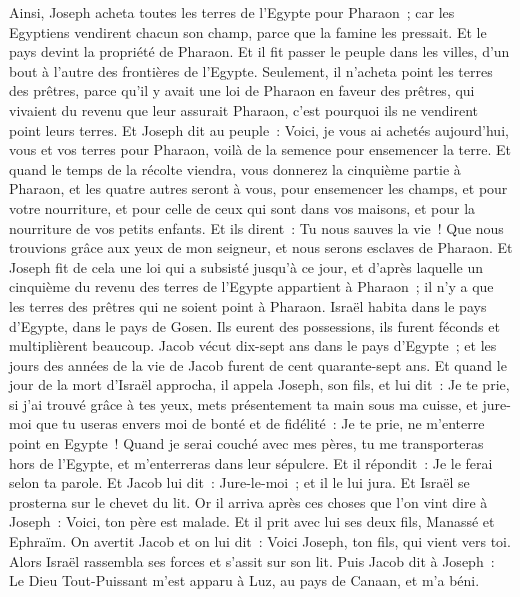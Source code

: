 \begin{multicols}{2}
Ainsi, Joseph acheta toutes les terres de l'Egypte pour Pharaon~; car les Egyptiens vendirent chacun son champ, parce que la famine les pressait. Et le pays devint la propriété de Pharaon.
Et il fit passer le peuple dans les villes, d'un bout à l'autre des frontières de l'Egypte.
Seulement, il n'acheta point les terres des prêtres, parce qu'il y avait une loi de Pharaon en faveur des prêtres, qui vivaient du revenu que leur assurait Pharaon, c'est pourquoi ils ne vendirent point leurs terres.
Et Joseph dit au peuple~: Voici, je vous ai achetés aujourd'hui, vous et vos terres pour Pharaon, voilà de la semence pour ensemencer la terre.
Et quand le temps de la récolte viendra, vous donnerez la cinquième partie à Pharaon, et les quatre autres seront à vous, pour ensemencer les champs, et pour votre nourriture, et pour celle de ceux qui sont dans vos maisons, et pour la nourriture de vos petits enfants.
Et ils dirent~: Tu nous sauves la vie~! Que nous trouvions grâce aux yeux de mon seigneur, et nous serons esclaves de Pharaon.
Et Joseph fit de cela une loi qui a subsisté jusqu'à ce jour, et d'après laquelle un cinquième du revenu des terres de l'Egypte appartient à Pharaon~; il n'y a que les terres des prêtres qui ne soient point à Pharaon.
Israël habita dans le pays d'Egypte, dans le pays de Gosen. Ils eurent des possessions, ils furent féconds et multiplièrent beaucoup.
Jacob vécut dix-sept ans dans le pays d'Egypte~; et les jours des années de la vie de Jacob furent de cent quarante-sept ans.
Et quand le jour de la mort d'Israël approcha, il appela Joseph, son fils, et lui dit~: Je te prie, si j'ai trouvé grâce à tes yeux, mets présentement ta main sous ma cuisse, et jure-moi que tu useras envers moi de bonté et de fidélité~: Je te prie, ne m'enterre point en Egypte~!
Quand je serai couché avec mes pères, tu me transporteras hors de l'Egypte, et m'enterreras dans leur sépulcre. Et il répondit~: Je le ferai selon ta parole.
Et Jacob lui dit~: Jure-le-moi~; et il le lui jura. Et Israël se prosterna sur le chevet du lit.
\VerseOne{}Or il arriva après ces choses que l'on vint dire à Joseph~: Voici, ton père est malade. Et il prit avec lui ses deux fils, Manassé et Ephraïm.
On avertit Jacob et on lui dit~: Voici Joseph, ton fils, qui vient vers toi. Alors Israël rassembla ses forces et s'assit sur son lit.
Puis Jacob dit à Joseph~: Le Dieu Tout-Puissant m'est apparu à Luz, au pays de Canaan, et m'a béni.

\end{multicols}
